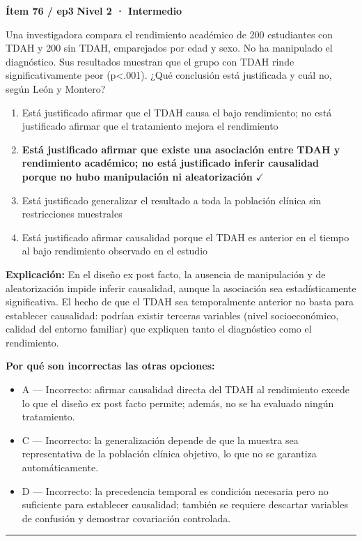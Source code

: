 \documentclass[12pt,a4paper]{article}
\begin{document}
\begin{mdframed}[backgroundcolor=fondogris,linecolor=ambar,linewidth=1pt,innerleftmargin=10pt,innerrightmargin=10pt,innertopmargin=7pt,innerbottommargin=7pt]
\textbf{Ítem 76 / ep3} \hfill {\small\bfseries\color{ambar} Nivel 2 · Intermedio}
\end{mdframed}

Una investigadora compara el rendimiento académico de 200 estudiantes con TDAH y 200 sin TDAH, emparejados por edad y sexo. No ha manipulado el diagnóstico. Sus resultados muestran que el grupo con TDAH rinde significativamente peor (p<.001). ¿Qué conclusión está justificada y cuál no, según León y Montero?

\begin{enumerate}
  \item[A.] Está justificado afirmar que el TDAH causa el bajo rendimiento; no está justificado afirmar que el tratamiento mejora el rendimiento
  \item[\textbf{\color{verde}B.}] \textbf{\color{verde} Está justificado afirmar que existe una asociación entre TDAH y rendimiento académico; no está justificado inferir causalidad porque no hubo manipulación ni aleatorización} \hfill $\checkmark$
  \item[C.] Está justificado generalizar el resultado a toda la población clínica sin restricciones muestrales
  \item[D.] Está justificado afirmar causalidad porque el TDAH es anterior en el tiempo al bajo rendimiento observado en el estudio
\end{enumerate}

\noindent\textbf{\color{azul}Explicación:} En el diseño ex post facto, la ausencia de manipulación y de aleatorización impide inferir causalidad, aunque la asociación sea estadísticamente significativa. El hecho de que el TDAH sea temporalmente anterior no basta para establecer causalidad: podrían existir terceras variables (nivel socioeconómico, calidad del entorno familiar) que expliquen tanto el diagnóstico como el rendimiento.

\noindent\textbf{\color{gris}Por qué son incorrectas las otras opciones:}
\begin{itemize}
  \item {\small A — Incorrecto: afirmar causalidad directa del TDAH al rendimiento excede lo que el diseño ex post facto permite; además, no se ha evaluado ningún tratamiento.}
  \item {\small C — Incorrecto: la generalización depende de que la muestra sea representativa de la población clínica objetivo, lo que no se garantiza automáticamente.}
  \item {\small D — Incorrecto: la precedencia temporal es condición necesaria pero no suficiente para establecer causalidad; también se requiere descartar variables de confusión y demostrar covariación controlada.}
\end{itemize}
\vspace{8pt}\hrule\vspace{10pt}
\end{document}

